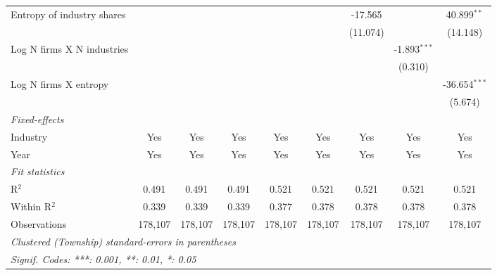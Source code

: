 \begin{tabular}{lcccccccc}
   Entropy of industry shares                            &                 &                 &                 &                  &                  & -17.565          &                  & 40.899$^{**}$\\   
                                                         &                 &                 &                 &                  &                  & (11.074)         &                  & (14.148)\\   
   Log N firms X N industries                            &                 &                 &                 &                  &                  &                  & -1.893$^{***}$   &   \\   
                                                         &                 &                 &                 &                  &                  &                  & (0.310)          &   \\   
   Log N firms X entropy                                 &                 &                 &                 &                  &                  &                  &                  & -36.654$^{***}$\\   
                                                         &                 &                 &                 &                  &                  &                  &                  & (5.674)\\   
   \midrule
   \emph{Fixed-effects}\\
   Industry                                              & Yes             & Yes             & Yes             & Yes              & Yes              & Yes              & Yes              & Yes\\  
   Year                                                  & Yes             & Yes             & Yes             & Yes              & Yes              & Yes              & Yes              & Yes\\  
   \midrule
   \emph{Fit statistics}\\
   R$^2$                                                 & 0.491           & 0.491           & 0.491           & 0.521            & 0.521            & 0.521            & 0.521            & 0.521\\  
   Within R$^2$                                          & 0.339           & 0.339           & 0.339           & 0.377            & 0.378            & 0.378            & 0.378            & 0.378\\  
   Observations                                          & 178,107         & 178,107         & 178,107         & 178,107          & 178,107          & 178,107          & 178,107          & 178,107\\  
   \midrule \midrule
   \multicolumn{9}{l}{\emph{Clustered (Township) standard-errors in parentheses}}\\
   \multicolumn{9}{l}{\emph{Signif. Codes: ***: 0.001, **: 0.01, *: 0.05}}\\
\end{tabular}
\par\endgroup
